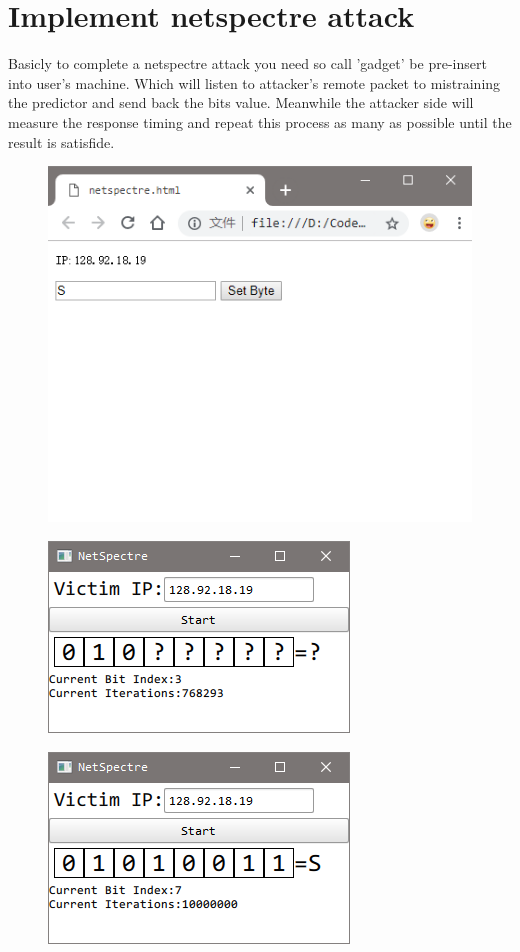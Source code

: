 \documentclass{article}
\begin{document}
\section{Implement netspectre attack}
Basicly to complete a netspectre attack you need so call 'gadget' be pre-insert into user's machine. Which will listen to attacker's remote packet to mistraining the predictor and send back the bits value. Meanwhile the attacker side will measure the response timing and repeat this process as many as possible until the result is satisfide.
\begin{figure}[H]\centering\includegraphics{05.png}\end{figure}
\begin{figure}[H]\centering\includegraphics{03.png}\end{figure}
\begin{figure}[H]\centering\includegraphics{04.png}\end{figure}
\end{document}
